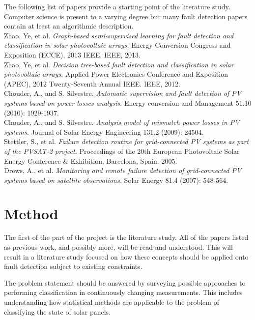 \documentclass[a4paper,11pt]{article}
\begin{document}
The following list of papers provide a starting point of the literature study.
Computer science is present to a varying degree but many fault detection papers contain at least an algorithmic description.\\

\noindent
Zhao, Ye, et al. \emph{Graph-based semi-supervised learning for fault detection and classification in solar photovoltaic arrays.} Energy Conversion Congress and Exposition (ECCE), 2013 IEEE. IEEE, 2013.\\

\noindent
Zhao, Ye, et al. \emph{Decision tree-based fault detection and classification in solar photovoltaic arrays.} Applied Power Electronics Conference and Exposition (APEC), 2012 Twenty-Seventh Annual IEEE. IEEE, 2012.\\

\noindent
Chouder, A., and S. Silvestre. \emph{Automatic supervision and fault detection of PV systems based on power losses analysis.} Energy conversion and Management 51.10 (2010): 1929-1937.\\

\noindent
Chouder, A., and S. Silvestre. \emph{Analysis model of mismatch power losses in PV systems.} Journal of Solar Energy Engineering 131.2 (2009): 24504.\\

\noindent
Stettler, S., et al. \emph{Failure detection routine for grid-connected PV systems as part of the PVSAT-2 project.} Proceedings of the 20th European Photovoltaic Solar Energy Conference \& Exhibition, Barcelona, Spain. 2005.\\

\noindent
Drews, A., et al. \emph{Monitoring and remote failure detection of grid-connected PV systems based on satellite observations.} Solar Energy 81.4 (2007): 548-564.

\section*{Method}
The first of the part of the project is the literature study.
All of the papers listed as previous work, and possibly more, will be read and understood.
This will result in a literature study focused on how these concepts should be applied onto fault detection subject to existing constraints.

The problem statement should be answered by surveying possible approaches to performing classification in continuously changing measurements.
This includes understanding how statistical methods are applicable to the problem of classifying the state of solar panels.
\end{document}
